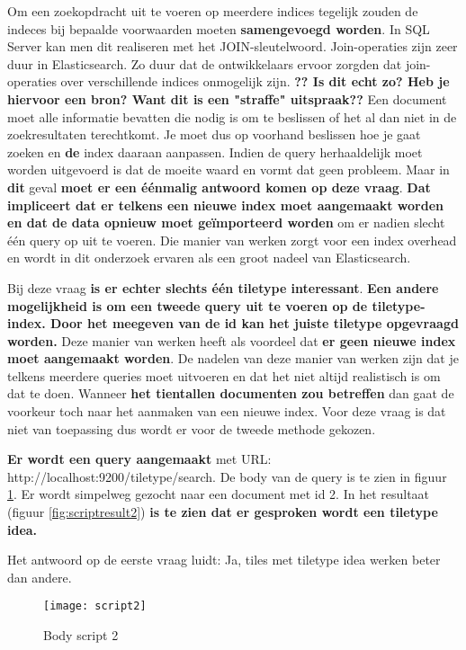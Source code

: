 Om een zoekopdracht uit te voeren op meerdere indices tegelijk zouden de indeces bij bepaalde voorwaarden moeten \textbf{samengevoegd worden}. In SQL Server kan men dit realiseren met het JOIN-sleutelwoord. Join-operaties zijn zeer duur in Elasticsearch. Zo duur dat de ontwikkelaars ervoor zorgden dat join-operaties over verschillende indices onmogelijk zijn. \textbf{?? Is dit echt zo? Heb je hiervoor een bron? Want dit is een "straffe" uitspraak??} Een document moet alle informatie bevatten die nodig is om te beslissen of het al dan niet in de zoekresultaten terechtkomt. Je moet dus op voorhand beslissen hoe je gaat zoeken en \textbf{de} index daaraan aanpassen. Indien de query herhaaldelijk moet worden uitgevoerd is dat de moeite waard en vormt dat geen probleem. Maar in \textbf{dit} geval \textbf{moet er een  éénmalig antwoord komen op deze vraag}. \textbf{Dat impliceert dat er telkens een nieuwe index moet aangemaakt worden en dat de data opnieuw moet geïmporteerd worden} om er nadien slecht één query op uit te voeren. Die manier van werken zorgt voor een index overhead en wordt in dit onderzoek ervaren als een groot nadeel van Elasticsearch.

Bij deze vraag \textbf{is er echter slechts één tiletype interessant}. \textbf{Een andere mogelijkheid is om een tweede query uit te voeren op de tiletype-index. Door het meegeven van de id kan het juiste tiletype opgevraagd worden.} Deze manier van werken heeft als voordeel dat \textbf{er geen nieuwe index moet aangemaakt worden}. De nadelen van deze manier van werken zijn dat je telkens meerdere queries moet uitvoeren en dat het niet altijd realistisch is om dat te doen. Wanneer \textbf{het tientallen documenten zou betreffen} dan gaat de voorkeur toch naar het aanmaken van een nieuwe index. Voor deze vraag is dat niet van toepassing dus wordt er voor de tweede methode gekozen.

\textbf{Er wordt een query aangemaakt} met URL: http://localhost:9200/tiletype/\textunderscore search. De body van de query is te zien in figuur \ref{fig:script2}. Er wordt simpelweg gezocht naar een document met id 2. In het resultaat (figuur \ref{fig:scriptresult2}) \textbf{is te zien dat er gesproken wordt een tiletype idea.} 

Het antwoord op de eerste vraag luidt: Ja, tiles met tiletype idea werken beter dan andere.

\begin{figure}
	\centering
	\texttt{[image: script2]}
	\caption{Body script 2}
	\label{fig:script2}
\end{figure}

